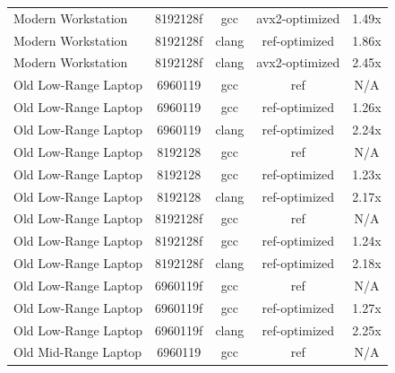 \begin{table}[H]
\begin{tabularx}{\linewidth}{X c c c c}
          Modern Workstation &             8192128f &                  gcc &       avx2-optimized &                1.49x\\
          Modern Workstation &             8192128f &                clang &        ref-optimized &                1.86x\\
          Modern Workstation &             8192128f &                clang &       avx2-optimized &                2.45x\\
        Old Low-Range Laptop &              6960119 &                  gcc &                  ref &                  N/A\\
        Old Low-Range Laptop &              6960119 &                  gcc &        ref-optimized &                1.26x\\
        Old Low-Range Laptop &              6960119 &                clang &        ref-optimized &                2.24x\\
        Old Low-Range Laptop &              8192128 &                  gcc &                  ref &                  N/A\\
        Old Low-Range Laptop &              8192128 &                  gcc &        ref-optimized &                1.23x\\
        Old Low-Range Laptop &              8192128 &                clang &        ref-optimized &                2.17x\\
        Old Low-Range Laptop &             8192128f &                  gcc &                  ref &                  N/A\\
        Old Low-Range Laptop &             8192128f &                  gcc &        ref-optimized &                1.24x\\
        Old Low-Range Laptop &             8192128f &                clang &        ref-optimized &                2.18x\\
        Old Low-Range Laptop &             6960119f &                  gcc &                  ref &                  N/A\\
        Old Low-Range Laptop &             6960119f &                  gcc &        ref-optimized &                1.27x\\
        Old Low-Range Laptop &             6960119f &                clang &        ref-optimized &                2.25x\\
        Old Mid-Range Laptop &              6960119 &                  gcc &                  ref &                  N/A\\

\end{tabularx}
\end{table}
